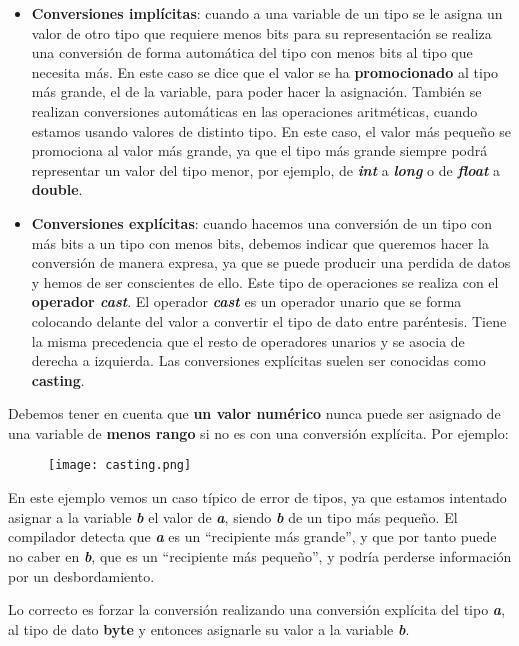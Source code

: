 \begin{itemize}
    \item \textbf{Conversiones implícitas}: cuando a una variable de un tipo se le asigna un valor de otro tipo que requiere menos bits para su representación se realiza una conversión de forma automática del tipo con menos bits al tipo que necesita más. En este caso se dice que el valor se ha \textbf{promocionado} al tipo más grande, el de la variable, para poder hacer la asignación. También se realizan conversiones automáticas en las operaciones aritméticas, cuando estamos usando valores de distinto tipo. En este caso, el valor más pequeño se promociona al valor más grande, ya que el tipo más grande siempre podrá representar un valor del tipo menor, por ejemplo, de \textbf{\textit{int}} a \textbf{\textit{long}} o de \textbf{\textit{float}} a \textbf{double}.

    \item \textbf{Conversiones explícitas}: cuando hacemos una conversión de un tipo con más bits a un tipo con menos bits, debemos indicar que queremos hacer la conversión de manera expresa, ya que se puede producir una perdida de datos y hemos de ser conscientes de ello. Este tipo de operaciones se realiza con el \textbf{operador \textit{cast}}. El operador \textbf{\textit{cast}} es un operador unario que se forma colocando delante del valor a convertir el tipo de dato entre paréntesis. Tiene la misma precedencia que el resto de operadores unarios y se asocia de derecha a izquierda. Las conversiones explícitas suelen ser conocidas como \textbf{casting}.
\end{itemize}

Debemos tener en cuenta que \textbf{un valor numérico} nunca puede ser asignado de una variable de \textbf{menos rango} si no es con una conversión explícita. Por ejemplo:

\begin{figure}[H]
    \texttt{[image: casting.png]}
\end{figure}

En este ejemplo vemos un caso típico de error de tipos, ya que estamos intentado asignar a la variable \textbf{\textit{b}} el valor de \textbf{\textit{a}}, siendo \textbf{\textit{b}} de un tipo más pequeño. El compilador detecta que \textbf{\textit{a}} es un ``recipiente más grande'', y que por tanto puede no caber en \textbf{\textit{b}}, que es un ``recipiente más pequeño'', y podría perderse información por un desbordamiento.

Lo correcto es forzar la conversión realizando una conversión explícita del tipo \textbf{\textit{a}}, al tipo de dato \textbf{byte} y entonces asignarle su valor a la variable \textbf{\textit{b}}.

